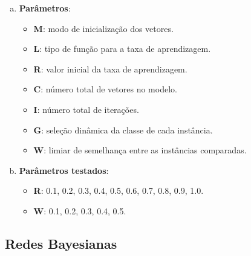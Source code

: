 \begin{enumerate}[a)]
    \item \textbf{Parâmetros}:
        \begin{itemize}

            \item \textbf{M}: modo de inicialização dos vetores.

            \item \textbf{L}: tipo de função para a taxa de aprendizagem.

            \item \textbf{R}: valor inicial da taxa de aprendizagem.

            \item \textbf{C}: número total de vetores no modelo.

            \item \textbf{I}: número total de iterações.

            \item \textbf{G}: seleção dinâmica da classe de cada instância.

            \item \textbf{W}: limiar de semelhança entre as instâncias comparadas.
        \end{itemize}
    \item \textbf{Parâmetros testados}:
        \begin{itemize}
            \item \textbf{R}: 0.1, 0.2, 0.3, 0.4, 0.5, 0.6, 0.7, 0.8, 0.9, 1.0.
            \item \textbf{W}: 0.1, 0.2, 0.3, 0.4, 0.5.
        \end{itemize}
\end{enumerate}

\subsection{Redes Bayesianas}

